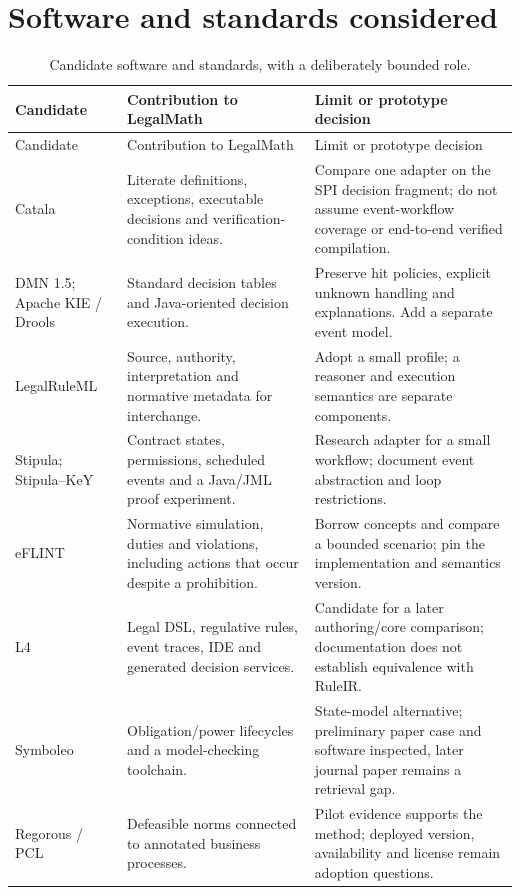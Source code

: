 \documentclass[12pt,a4paper,oneside,openany]{book}
\begin{document}
\section{Software and standards considered}
\begingroup\small
\begin{longtable}{P{0.19\textwidth}P{0.37\textwidth}P{0.34\textwidth}}
\caption{Candidate software and standards, with a deliberately bounded role.}
\label{tab:software-detail}\\
\toprule Candidate & Contribution to LegalMath & Limit or prototype decision \\\midrule
\endfirsthead
\toprule Candidate & Contribution to LegalMath & Limit or prototype decision \\\midrule
\endhead
Catala & Literate definitions, exceptions, executable decisions and verification-condition ideas. & Compare one adapter on the SPI decision fragment; do not assume event-workflow coverage or end-to-end verified compilation. \citep{catalacode}\\
DMN 1.5; Apache KIE / Drools & Standard decision tables and Java-oriented decision execution. & Preserve hit policies, explicit unknown handling and explanations. Add a separate event model. \citep{dmn2024,droolscode}\\
LegalRuleML & Source, authority, interpretation and normative metadata for interchange. & Adopt a small profile; a reasoner and execution semantics are separate components. \citep{legalruleml2021}\\
Stipula; Stipula--KeY & Contract states, permissions, scheduled events and a Java/JML proof experiment. & Research adapter for a small workflow; document event abstraction and loop restrictions. \citep{stipulacode,stipulakeycode}\\
eFLINT & Normative simulation, duties and violations, including actions that occur despite a prohibition. & Borrow concepts and compare a bounded scenario; pin the implementation and semantics version. \citep{eflint2026}\\
L4 & Legal DSL, regulative rules, event traces, IDE and generated decision services. & Candidate for a later authoring/core comparison; documentation does not establish equivalence with RuleIR. \citep{l4code}\\
Symboleo & Obligation/power lifecycles and a model-checking toolchain. & State-model alternative; preliminary paper case and software inspected, later journal paper remains a retrieval gap. \citep{symboleo2020,symboleocode}\\
Regorous / PCL & Defeasible norms connected to annotated business processes. & Pilot evidence supports the method; deployed version, availability and license remain adoption questions. \citep{semanticcompliance2016}\\

\end{longtable}
\end{document}
